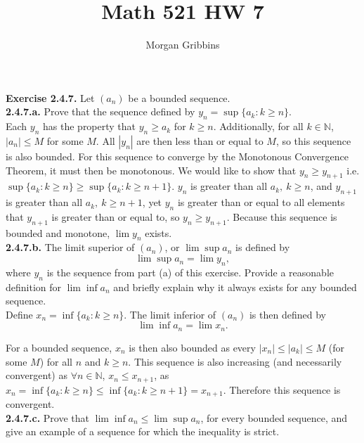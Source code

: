 \documentclass[12pt,letterpaper]{article}
\title{Math 521 HW 7}
\author{Morgan Gribbins}
\date{}
\begin{document}
	
\maketitle

\textbf{Exercise 2.4.7.} Let \((a_{n})\) be a bounded sequence. \\

\textbf{2.4.7.a.} Prove that the sequence defined by \(y_{n} = \sup \{a_{k} : k \geq n\}\). \\

Each \(y_{n}\) has the property that \(y_{n} \geq a_{k}\) for \(k \geq n\). Additionally, for all \(k \in \mathbb{N}\), \(|a_{n}| \leq M\) for some \(M\). All \(|y_{n}|\) are then less than or equal to \(M\), so this sequence is also bounded. For this sequence to converge by the Monotonous Convergence Theorem, it must then be monotonous. We would like to show that \(y_{n} \geq y_{n+1}\) i.e. \(\sup \{a_{k} : k \geq n\} \geq \sup \{a_{k} : k \geq n+1\}\). \(y_{n}\) is greater than all \(a_{k},\ k \geq n\), and \(y_{n+1}\) is greater than all \(a_{k},\ k \geq n+1\), yet \(y_{n}\) is greater than or equal to all elements that \(y_{n+1}\) is greater than or equal to, so \(y_{n} \geq y_{n+1}\). Because this sequence is bounded and monotone, \(\lim y_{n}\) exists. \\

\textbf{2.4.7.b.} The limit superior of \((a_{n})\), or \(\lim\sup a_{n}\) is defined by \[\lim\sup a_{n} = \lim y_{n},\] where \(y_{n}\) is the sequence from part (a) of this exercise. Provide a reasonable definition for \(\lim\inf a_{n}\) and briefly explain why it always exists for any bounded sequence. \\

Define \(x_{n} = \inf\{a_{k} : k \geq n\}\). The limit inferior of \((a_{n})\) is then defined by \[\lim\inf a_{n} = \lim x_{n}.\]

For a bounded sequence, \(x_{n}\) is then also bounded as every \(|x_{n}| \leq |a_{k}| \leq M\) (for some \(M\)) for all \(n\) and \(k \geq n\). This sequence is also increasing (and necessarily convergent) as \(\forall n\in \mathbb{N}\), \(x_{n} \leq x_{n+1}\), as \(x_{n} = \inf\{a_{k} : k \geq n\} \leq \inf\{a_{k} : k \geq n+1\} = x_{n+1}\). Therefore this sequence is convergent. \\

\textbf{2.4.7.c.} Prove that \(\lim\inf a_{n} \leq \lim\sup a_{n}\), for every bounded sequence, and give an example of a sequence for which the inequality is strict. \\
\end{document}
